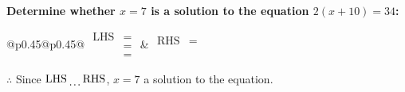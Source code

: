\documentclass[12pt, varwidth, border={5mm 5mm 5mm 5mm}]{standalone}
\begin{document}
    \noindent \textbf{Determine whether \(x = 7\) is a solution to the equation \(2(x + 10) = 34\):}
\vspace{4pt}  %

\noindent
\renewcommand{\arraystretch}{1.3} %
\begin{tabular}{@{}p{0.45\linewidth}@{}p{0.45\linewidth}@{}}
    \(\begin{aligned}
        \text{LHS} &=  \\
                   &=  \\
                   &= 
    \end{aligned}\) &
    \(\begin{aligned}
        \text{RHS} &= \\
                   & \\
                   &
    \end{aligned}\)
\end{tabular}
\renewcommand{\arraystretch}{1.0} %
\vspace{2pt}  %

\noindent \(\therefore\) Since \(\text{LHS} \dotuline{\hspace{5mm}} \text{RHS}\), \(x = 7\) \dotuline{\hspace{12mm}} a solution to the equation.
\end{document}
